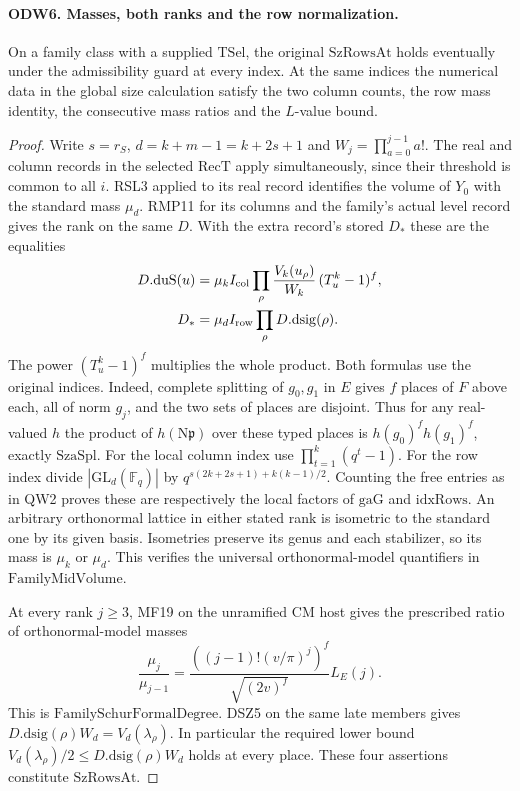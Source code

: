 \paragraph{ODW6. Masses, both ranks and the row normalization.}
\label{claim:ODW6}
On a family class with a supplied $\mathrm{TSel}$, the original
$\mathrm{SzRowsAt}$ holds eventually under the admissibility guard
at every index. At the same indices the numerical data in the
global size calculation satisfy the two column counts, the row
mass identity, the consecutive mass ratios and the $L$-value bound.
\begin{proof}
Write $s=r_S$, $d=k+m-1=k+2s+1$ and
$W_j=\prod_{a=0}^{j-1}a!$. The real and column records in the
selected $\mathrm{RecT}$ apply simultaneously, since their threshold
is common to all $i$. RSL3 applied to its real record identifies
the volume of $Y_0$ with the standard mass $\mu_d$.
RMP11 for its columns and the family's actual level record gives
the rank on the same $D$. With the extra record's stored $D_*$
these are the equalities
\[
 \begin{aligned}
 D.\mathrm{duS}(u)&=\mu_k I_{\rm col}
       \prod_\rho\frac{V_k(u_\rho)}{W_k}\,(T_u^k-1)^f,\\
 D_*&=\mu_d I_{\rm row}\prod_\rho D.\mathrm{dsig}(\rho).
 \end{aligned}
\]
The power $(T_u^k-1)^f$ multiplies the whole product. Both formulas
use the original indices. Indeed, complete splitting of $g_0,g_1$
in $E$ gives $f$ places of $F$ above each, all of norm $g_j$,
and the two sets of places are disjoint. Thus for any real-valued
$h$ the product of $h(\mathrm N\mathfrak p)$ over these typed
places is $h(g_0)^f h(g_1)^f$, exactly $\mathrm{SzaSpl}$.
For the local column index use $\prod_{t=1}^k(q^t-1)$.
For the row index divide $|\mathrm{GL}_d(\mathbb F_q)|$ by
$q^{s(2k+2s+1)+k(k-1)/2}$. Counting the free entries as in
QW2 proves these are respectively the local factors of
$\mathrm{gaG}$ and $\mathrm{idxRows}$. An arbitrary orthonormal
lattice in either stated rank is isometric to the standard one
by its given basis. Isometries preserve its genus and each stabilizer,
so its mass is $\mu_k$ or $\mu_d$. This verifies the universal
orthonormal-model quantifiers in $\mathrm{FamilyMidVolume}$.

At every rank $j\ge3$, MF19 on the unramified CM host gives the
prescribed ratio of orthonormal-model masses
\[
 \frac{\mu_j}{\mu_{j-1}}=
 \frac{((j-1)!(v/\pi)^j)^f}{\sqrt{(2v)^f}}L_E(j).
\]
This is $\mathrm{FamilySchurFormalDegree}$. DSZ5 on the same late
members gives $D.\mathrm{dsig}(\rho)W_d=V_d(\lambda_\rho)$.
In particular the required lower bound
$V_d(\lambda_\rho)/2\le D.\mathrm{dsig}(\rho)W_d$ holds at
every place. These four assertions constitute $\mathrm{SzRowsAt}$.


\end{proof}
